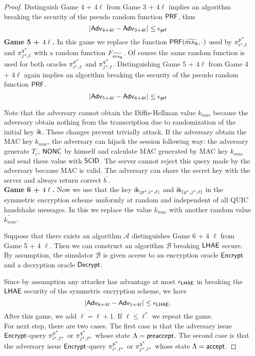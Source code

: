 \begin{proof}
 Distinguish Game 4 + 4$\ell$ from Game 3 + 4$\ell$ implies an algorithm breaking the security of the pseudo random function $\mathsf{PRF}$, thus
 \begin{equation}
  |\mathsf{Adv}_{4 + 4\ell} - \mathsf{Adv}_{3 + 4\ell}| \leq \epsilon_{\mathsf{prf}}
 \end{equation}%
%
%
 \textbf{Game 5 + $4\ell$.} In this game we replace the function $\mathsf{PRF}(\widetilde{ms_{\mathsf{ik}}}, \cdot)$ used by $\pi^{p^{\ast}}_{i^{\ast},\ell}$ and $\pi^{q^{\ast}}_{j^{\ast},\ell}$ with a random function $F_{\widetilde{ms_{\mathsf{ik}}}}$. Of course the same random function is used for both oracles $\pi^{p^{\ast}}_{i^{\ast},\ell}$ and $\pi^{q^{\ast}}_{j^{\ast},\ell}$. Distinguishing Game 5 + $4\ell$ from Game 4 + $4\ell$ again implies an algorithm breaking the security of the pseudo random function $\mathsf{PRF}$.
 \begin{equation}
  |\mathsf{Adv}_{5 + 4\ell} - \mathsf{Adv}_{4 + 4\ell}| \leq \epsilon_{\mathsf{prf}}
 \end{equation}%

 Note that the adversary cannot obtain the Diffie-Hellman value $k_{mac}$ because the adversary obtain nothing from the transcription due to randomization of the initial key $\mathsf{ik}$. These changes prevent trivially attack. If the adversary obtain the MAC key $k_{mac}$, the adversary can hijack the session following way: the adversary generate $T_c$, $\mathsf{NONC}$ by himself and calculate MAC generated by MAC key $k_{mac}$ and send these value with $\mathsf{SCID}$. The server cannot reject this query made by the adversary because MAC is valid. The adversary can share the secret key with the server and always return correct $b^{\prime}$.
\vspace{10pt}\\%
%
%
 \textbf{Game 6 + $4\ell$.} Now we use that the key $\mathsf{ik}_{(p^{\ast}, i^{\ast}, \ell)}$ and $\mathsf{ik}_{(q^{\ast}, j^{\ast}, \ell)}$ in the symmetric encryption scheme uniformly at random and independent of all QUIC handshake messages. In this we replace the value $k_{mac}$ with another random value $\widetilde{k_{mac}}$.

 Suppose that there exists an algorithm $\mathcal{A}$ distinguishes Game 6 + 4 $\ell$ from Game 5 + 4 $\ell$. Then we can construct an algorithm $\mathcal{B}$ breaking $\mathsf{LHAE}$ secure. By assumption, the simulator $\mathcal{B}$ is given access to an encryption oracle $\mathsf{Encrypt}$ and a decryption oracle $\mathsf{Decrypt}$.

 Since by assumption any attacker has advantage at most $\epsilon_{\mathsf{LHAE}}$ in breaking the $\mathsf{LHAE}$ security of the symmetric encryption scheme, we have
 \begin{equation}
  |\mathsf{Adv}_{6 + 4\ell} - \mathsf{Adv}_{5 + 4\ell}| \leq \epsilon_{\mathsf{LHAE}}.
 \end{equation}%
 After this game, we add $\ell = \ell + 1$. If $\ell \leq \ell^{\ast}$ we repeat the game.
\vspace{10pt}\\%
%
%
 For next step, there are two cases. The first case is that the adversary issue $\mathsf{Encrypt}$-query $\pi^{p^{\ast}}_{i^{\ast},\ell^{\ast}}$ or $\pi^{q^{\ast}}_{j^{\ast},\ell^{\ast}}$ whose state $\Lambda = \mathsf{preaccept}$. The second case is that the adversary issue $\mathsf{Encrypt}$-query $\pi^{p^{\ast}}_{i^{\ast},\ell^{\ast}}$ or $\pi^{q^{\ast}}_{j^{\ast},\ell^{\ast}}$ whose state $\Lambda = \mathsf{accept}$.


\end{proof}
